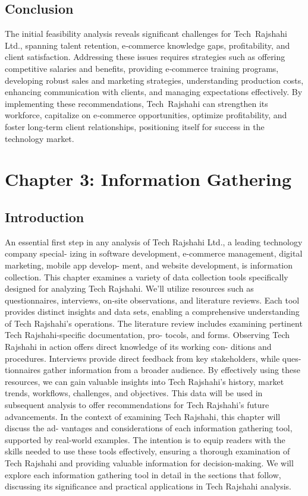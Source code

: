 \documentclass[12pt,a4paper]{article}
\begin{document}
\subsection{Conclusion}
The initial feasibility analysis reveals significant challenges for Tech Rajshahi Ltd., spanning talent retention, e‑commerce knowledge gaps, profitability, and client satisfaction.  Addressing these issues requires strategies such as offering competitive salaries and benefits, providing e‑commerce training programs, developing robust sales and marketing strategies, understanding production costs, enhancing communication with clients, and managing expectations effectively.  By implementing these recommendations, Tech Rajshahi can strengthen its workforce, capitalize on e‑commerce opportunities, optimize profitability, and foster long‑term client relationships, positioning itself for success in the technology market.

\newpage

\section{Chapter 3: Information Gathering}

\subsection{Introduction}
An essential first step in any analysis of Tech Rajshahi Ltd., a leading technology company special-
izing in software development, e-commerce management, digital marketing, mobile app develop-
ment, and website development, is information collection. This chapter examines a variety of data
collection tools specifically designed for analyzing Tech Rajshahi. We’ll utilize resources such as
questionnaires, interviews, on-site observations, and literature reviews. Each tool provides distinct
insights and data sets, enabling a comprehensive understanding of Tech Rajshahi’s operations.
The literature review includes examining pertinent Tech Rajshahi-specific documentation, pro-
tocols, and forms. Observing Tech Rajshahi in action offers direct knowledge of its working con-
ditions and procedures. Interviews provide direct feedback from key stakeholders, while ques-
tionnaires gather information from a broader audience. By effectively using these resources, we
can gain valuable insights into Tech Rajshahi’s history, market trends, workflows, challenges, and
objectives.
This data will be used in subsequent analysis to offer recommendations for Tech Rajshahi’s
future advancements. In the context of examining Tech Rajshahi, this chapter will discuss the ad-
vantages and considerations of each information gathering tool, supported by real-world examples.
The intention is to equip readers with the skills needed to use these tools effectively, ensuring a
thorough examination of Tech Rajshahi and providing valuable information for decision-making.
We will explore each information gathering tool in detail in the sections that follow, discussing its
significance and practical applications in Tech Rajshahi analysis.
\end{document}
